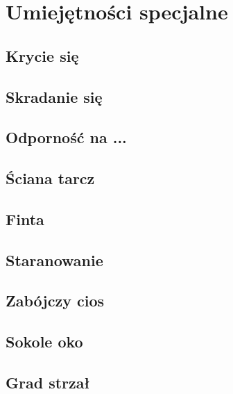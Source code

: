 \chapter{Umiejętności specjalne}

\section{Krycie się} 
 \label{sec:link_uw_krycie_sie}

\section{Skradanie się} 
 \label{sec:link_uw_skradnie_sie}

\section{Odporność na ...} 
 \label{sec:link_uw_odpornosc}

\section{Ściana tarcz} 
 \label{sec:link_uw_sciana_tarcz}

\section{Finta}  \label{sec:link_uw_finta}

\section{Staranowanie}  \label{sec:link_uw_staranowanie}

\section{Zabójczy cios}  \label{sec:link_uw_zabojczy_cios}

\section{Sokole oko}  \label{sec:link_uw_sokole_oko}

\section{Grad strzał}  \label{sec:link_uw_grad_strzal}

